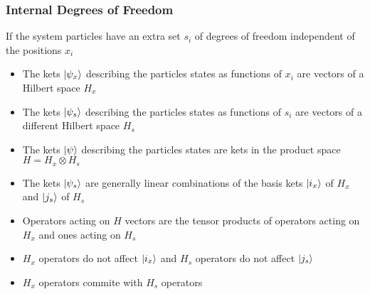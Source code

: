 \documentclass[8pt,t,mathserif,aspectratio=169]{beamer}
\begin{document}
\begin{frame}
  \frametitle{Internal Degrees of Freedom}
  \vspace{1mm}
  If the system particles have an extra set $s_i$ of degrees of freedom independent of the positions $x_i$
  \begin{itemize}
    \item The kets $\ket{\psi_x}$ describing the particles states as functions of $x_i$ are vectors of a Hilbert space $H_x$
    \item The kets $\ket{\psi_s}$ describing the particles states as functions of $s_i$ are vectors of a different Hilbert space $H_s$
    \item The kets $\ket{\psi}$ describing the particles states are kets in the product space $H = H_x \otimes H_s$
    \item The kets $\ket{\psi_s}$ are generally linear combinations of the basis kets $\ket{i_x}$ of $H_x$ and $\ket{j_s}$ of $H_s$
    \item Operators acting on $H$ vectors are the tensor products of operators acting on $H_x$ and ones acting on $H_s$
    \item $H_x$ operators do not affect $\ket{i_x}$ and $H_s$ operators do not affect $\ket{j_s}$
    \item $H_x$ operators commite with $H_s$ operators
  \end{itemize}
\end{frame}
\end{document}
